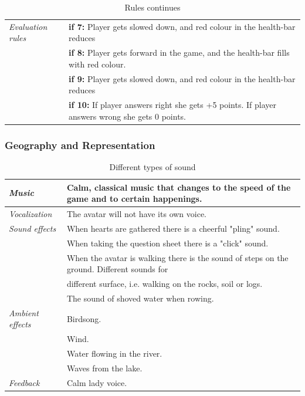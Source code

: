 \begin{table} [H]
\centering
\begin{tabular}{|p{}|p{}|}
\hline
\emph{Evaluation rules} & \textbf{if 7:} Player gets slowed down, and red colour in the health-bar reduces   \\ \cline{2-2}
& \textbf{if 8:} Player gets forward in the game, and the health-bar fills with red colour.   \\ \cline{2-2}
& \textbf{if 9:} Player gets slowed down, and red colour in the health-bar reduces   \\ \cline{2-2}
& \textbf{if 10:} If player answers right she gets +5 points. If player answers wrong she gets 0 points.  \\ \hline
\end{tabular}
\caption[Rules in the "Nature Trail" game]{Rules continues}
\label{tab:rules11}
\end{table}  

\subsubsection{Geography and Representation}

\begin{table} [H]
\centering
\begin{tabular}{|p{}|p{}|}
\hline
\emph{Music} & Calm, classical music that changes to the speed of the game and to certain happenings. \\ \hline
\emph{Vocalization} & The avatar will not have its own voice. \\ \hline
\emph{Sound effects} &  When hearts are gathered there is a cheerful "pling" sound.  \\ \cline{2-2}
&  When taking the question sheet there is a "click" sound.\\ \cline{2-2}
& When the avatar is walking there is the sound of steps on the ground. Different sounds for \\ & different surface, i.e. walking on the rocks, soil or logs.\\ \cline{2-2}
& The sound of shoved water when rowing. \\ \hline
\emph{Ambient effects} & Birdsong. \\ \cline{2-2}
& Wind. \\ \cline{2-2}
& Water flowing in the river. \\ \cline{2-2}
& Waves from the lake.\\ \hline
\emph{Feedback} & Calm lady voice. \\ \hline
\end{tabular}
\caption[Different types of sound]{Different types of sound}
\label{tab:sound1}
\end{table}  

